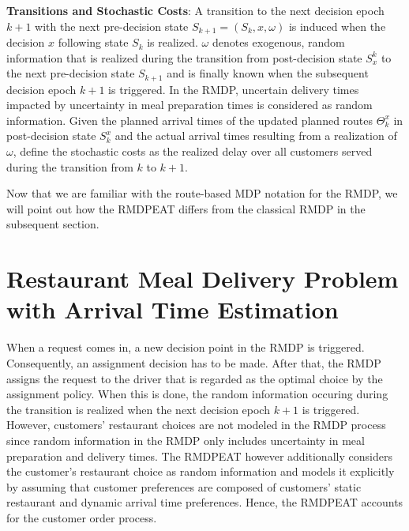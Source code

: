 \begin{description}[font=$\bullet$\scshape\bfseries]
	\item \textbf{Transitions and Stochastic Costs}: A transition to the next decision epoch $ k+1 $  with the next pre-decision state $ S_{k+1} = (S_k, x, \omega) $ is induced when the decision $ x $ following state $ S_k $ is realized. $ \omega $ denotes exogenous, random information that is realized during the transition from post-decision state $ S^{k}_x $ to the next pre-decision state $ S_{k+1} $ and is finally known when the subsequent decision epoch $ k+1 $ is triggered. In the RMDP, uncertain delivery times impacted by uncertainty in meal preparation times is considered as random information. Given the planned arrival times of the updated planned routes $ \Theta^{x}_k $ in post-decision state $ S^{x}_k $ and the actual arrival times resulting from a realization of $ \omega $, \cite{UlmerRMDP} define the stochastic costs as the realized delay over all customers served during the transition from $ k $ to $ k+1 $.
\end{description}

Now that we are familiar with the route-based MDP notation for the RMDP, we will point out how the RMDPEAT differs from the classical RMDP in the subsequent section. 
\section{Restaurant Meal Delivery Problem with Arrival Time Estimation}

When a request comes in, a new decision point in the RMDP is triggered. Consequently, an assignment decision has to be made. After that, the RMDP assigns the request to the driver that is regarded as the optimal choice by the assignment policy. When this is done, the random information occuring during the transition is realized when the next decision epoch $ k+1 $ is triggered. However, customers' restaurant choices are not modeled in the RMDP process since random information in the RMDP only includes uncertainty in meal preparation and delivery times. The RMDPEAT however additionally considers the customer's restaurant choice as random information and models it explicitly by assuming that customer preferences are composed of customers' static restaurant and dynamic arrival time preferences. Hence, the RMDPEAT accounts for the customer order process. 

